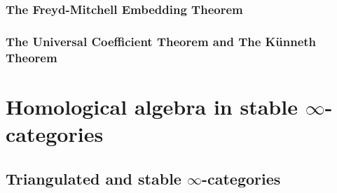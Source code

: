             \subsubsection{The Freyd-Mitchell Embedding Theorem}
            
            \subsubsection{The Universal Coefficient Theorem and The K\"unneth Theorem}
    
    \section{Homological algebra in stable \texorpdfstring{$\infty$}{}-categories} \label{section: homological_algebra}
        \subsection{Triangulated and stable \texorpdfstring{$\infty$}{}-categories}
